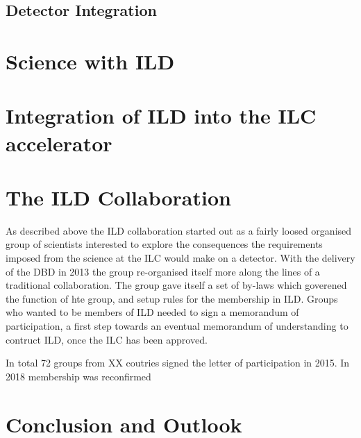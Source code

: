 \documentclass[%
 preprint,
 amsmath,amssymb,
 aps,
]{revtex4-1}
\begin{document}
\subsection{Detector Integration}

\section{Science with ILD}

\section{Integration of ILD into the ILC accelerator}

\section{The ILD Collaboration}
As described above the ILD collaboration started out as a fairly loosed organised group of scientists interested to explore the consequences the requirements imposed from the science at the ILC would make on a detector. With the delivery of the DBD in 2013 the group re-organised itself more along the lines of a traditional collaboration. The group gave itself a set of by-laws which goverened the function of hte group, and setup rules for the membership in ILD. Groups who wanted to be members of ILD needed to sign a memorandum of participation, a first step towards an eventual memorandum of understanding to contruct ILD, once the ILC has been approved. 

In total 72 groups from XX coutries signed the letter of participation in 2015. In 2018 membership was reconfirmed 



\section{Conclusion and Outlook}
\end{document}
